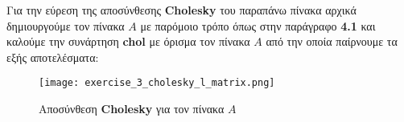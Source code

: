 \documentclass[First Project.tex]{subfiles}
\begin{document}
\vspace{5px}
Για την εύρεση της αποσύνθεσης \textlatin{\textbf{Cholesky}} του παραπάνω πίνακα αρχικά δημιουργούμε τον πίνακα $Α$ με παρόμοιο τρόπο όπως στην
παράγραφο \textbf{4.1} και καλούμε την συνάρτηση \textlatin{\textbf{chol}} με όρισμα τον πίνακα $Α$ από την οποία παίρνουμε τα εξής αποτελέσματα:
\begin{figure}[h!]
    \centering
    \captionsetup{justification=centering}
    \begin{center}
        \texttt{[image: exercise\_3\_cholesky\_l\_matrix.png]}    
        \caption{ Αποσύνθεση \textlatin{\textbf{Cholesky}} για τον πίνακα $Α$ }
    \end{center}
\end{figure} 
\end{document}
